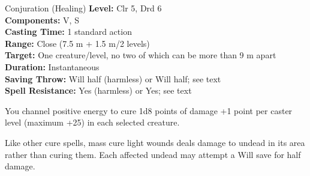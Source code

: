 {Conjuration (Healing)}
{
	\textbf{Level:}
	Clr 5, Drd 6\\
	\textbf{Components:}
	V, S\\
	\textbf{Casting Time:}
	1 standard action\\
	\textbf{Range:}
	Close (7.5 m + 1.5 m/2 levels)\\
	\textbf{Target:}
	One creature/level, no two of which can be more than 9 m apart\\
	\textbf{Duration:}
	Instantaneous\\
	\textbf{Saving Throw:}
	Will half (harmless) or Will half; see text\\
	\textbf{Spell Resistance:}
	Yes (harmless) or Yes; see text\\
}
{
	You channel positive energy to cure 1d8 points of damage +1 point per caster level (maximum +25) in each selected creature.

	Like other cure spells, mass cure light wounds deals damage to undead in its area rather than curing them. Each affected undead may attempt a Will save for half damage.

}
